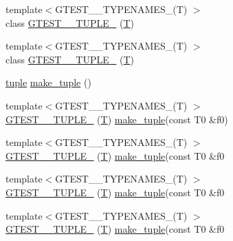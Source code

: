 \begin{DoxyCompactItemize}
\item 
{\footnotesize template$<$G\+T\+E\+S\+T\+\_\+\_\+\+T\+Y\+P\+E\+N\+A\+M\+E\+S\+\_\+(\+T) $>$ }\\class \hyperlink{namespacestd_1_1tr1_ab2b1c72e9db7436909d9ac011645f29d}{G\+T\+E\+S\+T\+\_\+\_\+\+T\+U\+P\+L\+E\+\_\+} (\hyperlink{functions__7_8js_adf1f3edb9115acb0a1e04209b7a9937b}{T})
\item 
{\footnotesize template$<$G\+T\+E\+S\+T\+\_\+\_\+\+T\+Y\+P\+E\+N\+A\+M\+E\+S\+\_\+(\+T) $>$ }\\class \hyperlink{namespacestd_1_1tr1_ab4f2c7d5458171bec6c4330fc5c7aba6}{G\+T\+E\+S\+T\+\_\+\_\+\+T\+U\+P\+L\+E\+\_\+} (\hyperlink{functions__7_8js_adf1f3edb9115acb0a1e04209b7a9937b}{T})
\item 
\hyperlink{classstd_1_1tr1_1_1tuple}{tuple} \hyperlink{namespacestd_1_1tr1_af7e12a0f5b5791b5b7c49a5a17b85359}{make\+\_\+tuple} ()
\item 
{\footnotesize template$<$G\+T\+E\+S\+T\+\_\+\_\+\+T\+Y\+P\+E\+N\+A\+M\+E\+S\+\_\+(\+T) $>$ }\\\hyperlink{namespacestd_1_1tr1_a8b196fb65b7521a688f59c51418ab191}{G\+T\+E\+S\+T\+\_\+\_\+\+T\+U\+P\+L\+E\+\_\+} (\hyperlink{functions__7_8js_adf1f3edb9115acb0a1e04209b7a9937b}{T}) \hyperlink{namespacestd_1_1tr1_af7e12a0f5b5791b5b7c49a5a17b85359}{make\+\_\+tuple}(const T0 \&f0)
\item 
{\footnotesize template$<$G\+T\+E\+S\+T\+\_\+\_\+\+T\+Y\+P\+E\+N\+A\+M\+E\+S\+\_\+(\+T) $>$ }\\\hyperlink{namespacestd_1_1tr1_a90d9f0e7f95fa1c2093372d72493c3c1}{G\+T\+E\+S\+T\+\_\+\_\+\+T\+U\+P\+L\+E\+\_\+} (\hyperlink{functions__7_8js_adf1f3edb9115acb0a1e04209b7a9937b}{T}) \hyperlink{namespacestd_1_1tr1_af7e12a0f5b5791b5b7c49a5a17b85359}{make\+\_\+tuple}(const T0 \&f0
\item 
{\footnotesize template$<$G\+T\+E\+S\+T\+\_\+\_\+\+T\+Y\+P\+E\+N\+A\+M\+E\+S\+\_\+(\+T) $>$ }\\\hyperlink{namespacestd_1_1tr1_a4493d91e61718415264f7e72fea42930}{G\+T\+E\+S\+T\+\_\+\_\+\+T\+U\+P\+L\+E\+\_\+} (\hyperlink{functions__7_8js_adf1f3edb9115acb0a1e04209b7a9937b}{T}) \hyperlink{namespacestd_1_1tr1_af7e12a0f5b5791b5b7c49a5a17b85359}{make\+\_\+tuple}(const T0 \&f0
\item 
{\footnotesize template$<$G\+T\+E\+S\+T\+\_\+\_\+\+T\+Y\+P\+E\+N\+A\+M\+E\+S\+\_\+(\+T) $>$ }\\\hyperlink{namespacestd_1_1tr1_a4e57e6fab4219802275bd31821b31b58}{G\+T\+E\+S\+T\+\_\+\_\+\+T\+U\+P\+L\+E\+\_\+} (\hyperlink{functions__7_8js_adf1f3edb9115acb0a1e04209b7a9937b}{T}) \hyperlink{namespacestd_1_1tr1_af7e12a0f5b5791b5b7c49a5a17b85359}{make\+\_\+tuple}(const T0 \&f0

\end{DoxyCompactItemize}
